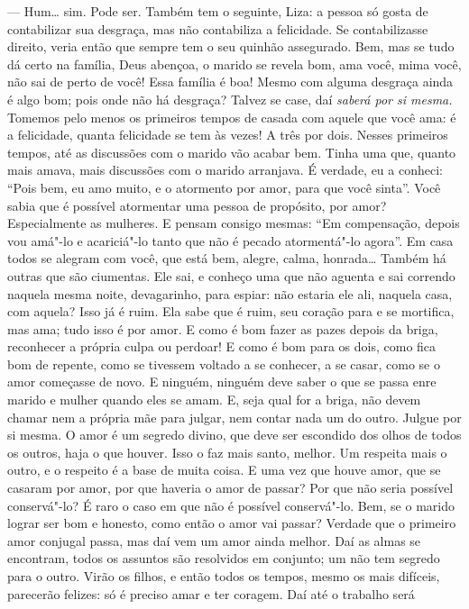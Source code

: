--- Hum\ldots{} sim. Pode ser. Também tem o seguinte, Liza: a pessoa só gosta
de contabilizar sua desgraça, mas não contabiliza a felicidade. Se
contabilizasse direito, veria então que sempre tem o seu quinhão
assegurado. Bem, mas se tudo dá certo na família, Deus abençoa, o marido
se revela bom, ama você, mima você, não sai de perto de você! Essa
família é boa! Mesmo com alguma desgraça ainda é algo bom; pois onde não
há desgraça? Talvez se case, daí \emph{saberá por si mesma.} Tomemos
pelo menos os primeiros tempos de casada com aquele que você ama: é a
felicidade, quanta felicidade se tem às vezes! A três por dois. Nesses
primeiros tempos, até as discussões com o marido vão acabar bem. Tinha
uma que, quanto mais amava, mais discussões com o marido arranjava. É
verdade, eu a conheci: ``Pois bem, eu amo muito, e o atormento por amor,
para que você sinta''. Você sabia que é possível atormentar uma pessoa
de propósito, por amor? Especialmente as mulheres. E pensam consigo
mesmas: ``Em compensação, depois vou amá"-lo e acariciá"-lo tanto que não
é pecado atormentá"-lo agora''. Em casa todos se alegram com você, que
está bem, alegre, calma, honrada\ldots{} Também há outras que são ciumentas.
Ele sai, e conheço uma que não aguenta e sai correndo naquela mesma
noite, devagarinho, para espiar: não estaria ele ali, naquela casa, com
aquela? Isso já é ruim. Ela sabe que é ruim, seu coração para e se
mortifica, mas ama; tudo isso é por amor. E como é bom fazer as pazes
depois da briga, reconhecer a própria culpa ou perdoar! E como é bom
para os dois, como fica bom de repente, como se tivessem voltado a se
conhecer, a se casar, como se o amor começasse de novo. E ninguém,
ninguém deve saber o que se passa enre marido e mulher quando eles se
amam. E, seja qual for a briga, não devem chamar nem a própria mãe para
julgar, nem contar nada um do outro. Julgue por si mesma. O amor é um
segredo divino, que deve ser escondido dos olhos de todos os outros,
haja o que houver. Isso o faz mais santo, melhor. Um respeita mais o
outro, e o respeito é a base de muita coisa. E uma vez que houve amor,
que se casaram por amor, por que haveria o amor de passar? Por que não
seria possível conservá"-lo? É raro o caso em que não é possível
conservá"-lo. Bem, se o marido lograr ser bom e honesto, como então o
amor vai passar? Verdade que o primeiro amor conjugal passa, mas daí vem
um amor ainda melhor. Daí as almas se encontram, todos os assuntos são
resolvidos em conjunto; um não tem segredo para o outro. Virão os
filhos, e então todos os tempos, mesmo os mais difíceis, parecerão
felizes: só é preciso amar e ter coragem. Daí até o trabalho será

